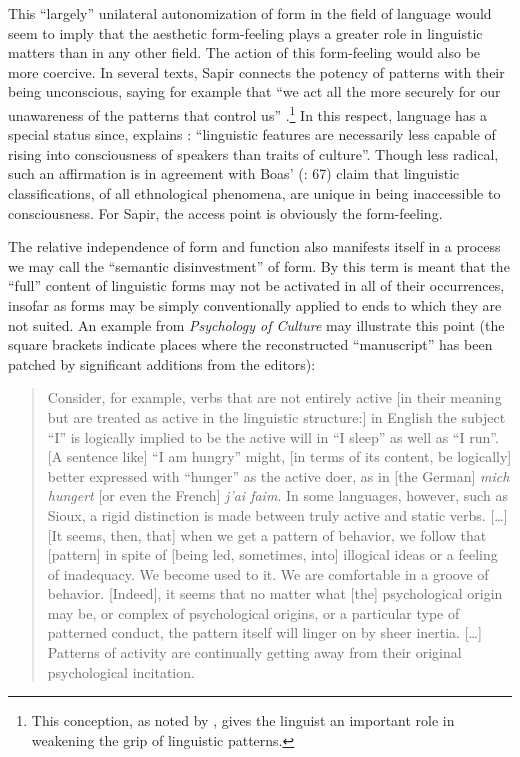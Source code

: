 \documentclass[output=paper]{langscibook}
\begin{document}
This ``largely'' unilateral autonomization of form in the field of language would seem to imply that the aesthetic form-feeling plays a greater role in linguistic matters than in any other field. The action of this form-feeling would also be more coercive. In several texts, Sapir connects the potency of patterns with their being unconscious, saying for example that ``we act all the more securely for our unawareness of the patterns that control us'' \citep[549]{Sapir1927a}.\footnote{This conception, as noted by \citet{Joseph2002}, gives the linguist an important role in weakening the grip of linguistic patterns.} In this respect, language has a special status since, explains \citet[100]{Sapir1912}: ``linguistic features are necessarily less capable of rising into consciousness of speakers than traits of culture''. Though less radical, such an affirmation is in agreement with Boas' (\citeyear{Boas1911}: 67) claim that linguistic classifications, of all ethnological phenomena, are unique in being inaccessible to consciousness. For Sapir, the access point is obviously the form-feeling. 

The relative independence of form and function also manifests itself in a process we may call the ``semantic disinvestment'' of form. By this term is meant that the ``full'' content of linguistic forms may not be activated in all of their occurrences, insofar as forms may be simply conventionally applied to ends to which they are not suited. An example from \emph{Psychology of Culture} may illustrate this point (the square brackets indicate places where the reconstructed ``manuscript'' has been patched by significant additions from the editors): 

\begin{quotation}
Consider, for example, verbs that are not entirely active [in their meaning but are treated as active in the linguistic structure:] in English the subject ``I'' is logically implied to be the active will in ``I sleep'' as well as ``I run''. [A sentence like] ``I am hungry'' might, [in terms of its content, be logically] better expressed with ``hunger'' as the active doer, as in [the German] \emph{mich hungert} [or even the French] \emph{j’ai faim}. In some languages, however, such as Sioux, a rigid distinction is made between truly active and static verbs. […] [It seems, then, that] when we get a pattern of behavior, we follow that [pattern] in spite of [being led, sometimes, into] illogical ideas or a feeling of inadequacy. We become used to it. We are comfortable in a groove of behavior. [Indeed], it seems that no matter what [the] psychological origin may be, or complex of psychological origins, or a particular type of patterned conduct, the pattern itself will linger on by sheer inertia. […] Patterns of activity are continually getting away from their original psychological incitation. \citep[109--110]{Sapir2002}
\end{quotation}
\end{document}
